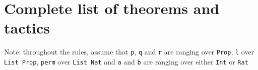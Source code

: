 \documentclass[
	msc,
	english
]{ppgccufmg}
\begin{document}
		
		

    \appendix
    \chapter{Complete list of theorems and tactics}

    Note: throughout the rules, assume that \texttt{p}, \texttt{q} and \texttt{r}
    are ranging over \texttt{Prop}, \texttt{l} over \texttt{List Prop}, \texttt{perm}
    over \texttt{List Nat} and \texttt{a} and \texttt{b} are ranging over either  \texttt{Int}
    or \texttt{Rat}

\end{document}
